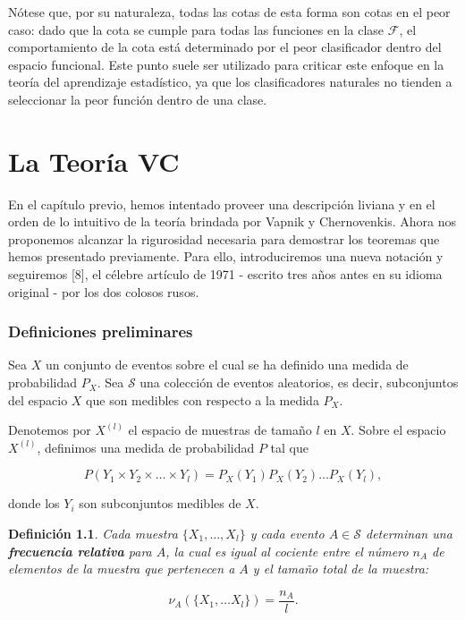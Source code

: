 \documentclass{report}
\newtheorem{dfn}{Definición}[subsection]
\begin{document}
Nótese que, por su naturaleza, todas las cotas de esta forma son cotas en el peor caso: dado que 
la cota se cumple para todas las funciones en la clase \(\mathcal{F}\), el comportamiento de la cota 
está determinado por el peor clasificador dentro del espacio funcional. Este punto suele ser 
utilizado para criticar este enfoque en la teoría del aprendizaje estadístico, ya que los clasificadores 
naturales no tienden a seleccionar la peor función dentro de una clase.\newline


\chapter{La Teoría VC}

En el capítulo previo, hemos intentado proveer una descripción liviana y en el orden de lo intuitivo de la teoría brindada por 
Vapnik y Chernovenkis. Ahora nos proponemos alcanzar la rigurosidad necesaria para demostrar los teoremas que hemos presentado 
previamente. Para ello, introduciremos una nueva notación y seguiremos [8], el célebre artículo de 1971 - escrito tres años antes en su 
idioma original - por los dos colosos rusos.\newline

\subsection{Definiciones preliminares}

Sea \( X \) un conjunto de eventos sobre el cual se ha definido una medida de probabilidad \( P_X \). Sea \( \mathcal{S} \) una colección de eventos 
aleatorios, es decir, subconjuntos del espacio \( X \) que son medibles con respecto 
a la medida \( P_X \). \newline

Denotemos por \( X^{(l)} \) el espacio de muestras de tamaño \( l \) en \( X \). 
Sobre el espacio \( X^{(l)} \), definimos una medida de probabilidad \( P \) tal que

\begin{equation}\label{def: probabilidad en espacio muestral}
P(Y_1\times Y_2 \times\dots\times Y_l) = P_X(Y_1) P_X(Y_2) \dots P_X(Y_l),
\end{equation}

donde los \( Y_i \) son subconjuntos medibles de \( X \).\newline

\begin{dfn}
Cada muestra \( \{X_1, \dots, X_l\} \) y cada evento \( A \in \mathcal{S} \) determinan 
una \textbf{frecuencia relativa} para \( A \), la cual es igual al cociente entre 
el número \( n_A \) de elementos de la muestra que pertenecen a \( A \) y el tamaño 
total de la muestra:

\[
\nu_A(\{X_1,\dots X_l\}) = \frac{n_A}{l}.
\]

\end{dfn}
\end{document}
